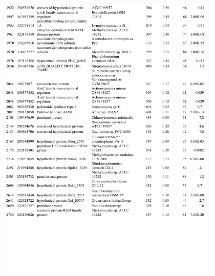 \begin{figure}[H]
\centering
    \includegraphics[width=1.0\textwidth]{./tex/chapter1/figures/supplemental/TableS1d.pdf}
\end{figure}
